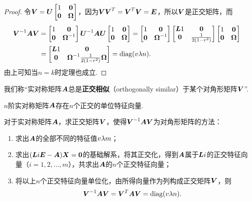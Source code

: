 \begin{theorem}
\begin{proof}
令\(\Q=\P\begin{bmatrix} 1 & \z \\ \z & \M \end{bmatrix}\)，因为\(\Q\Q^T=\Q^T\Q=\E\)，所以\(\Q\)是正交矩阵，而\begin{align*}
\Q^{-1}\A\Q
&=\begin{bmatrix}
1 & \z \\
\z & \M^{-1}
\end{bmatrix}\P^{-1}\A\P\begin{bmatrix}
1 & \z \\
\z & \M
\end{bmatrix}=\begin{bmatrix}
1 & \z \\
\z & \M^{-1}
\end{bmatrix}\begin{bmatrix}
\L1 & \z \\
\z & \B
\end{bmatrix}\begin{bmatrix}
1 & \z \\
\z & \M
\end{bmatrix} \\
&=\begin{bmatrix}
\L1 & \z \\
\z & \M^{-1}\B\M
\end{bmatrix}
=\diag(\v{\lambda}{n}).
\end{align*}
由上可知当\(n=k\)时定理也成立.
\end{proof}
\rm
我们称“实对称矩阵\(\boldsymbol{A}\)总是\textbf{正交相似}（{orthogonally similar}）于某个对角形矩阵\(\boldsymbol{V}\)”.
\end{theorem}

\begin{corollary}
\(n\)阶实对称矩阵\(\boldsymbol{A}\)存在\(n\)个正交的单位特征向量.
\end{corollary}

\begingroup
\color{red}
对于实对称矩阵\(\boldsymbol{A}\)，求正交矩阵\(\Q\)，使得\(\Q^{-1}\A\Q\)为对角形矩阵的方法：
\begin{enumerate}
\item 求出\(\boldsymbol{A}\)的全部不同的特征值\(v{\lambda}{m}\)；
\item 求出\((\boldsymbol{L}{i}\boldsymbol{E}-\boldsymbol{A})\boldsymbol{X}=\boldsymbol{0}\)的基础解系，将其正交化，得到\(\boldsymbol{A}\)属于\(\boldsymbol{L}{i}\)的正交特征向量（\(i=1,2,\dotsc,m\)），共求出\(\boldsymbol{A}\)的\(n\)个正交特征向量；
\item 将以上\(n\)个正交特征向量单位化，由所得向量作为列构成正交矩阵\(\Q\)，则\[
\Q^{-1}\A\Q = \Q^T \A \Q = \diag(\v{\lambda}{n}).
\]
\end{enumerate}
\endgroup

